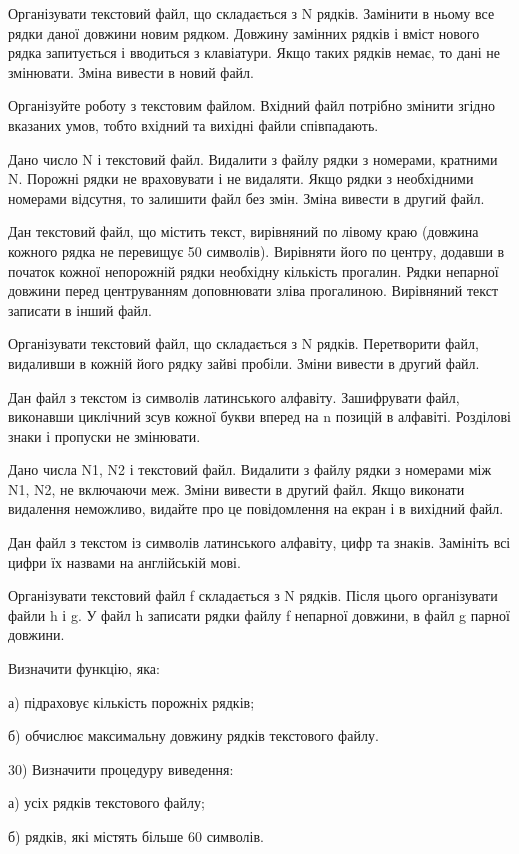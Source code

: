 \documentclass[]{article}
\begin{document}
Організувати текстовий файл, що складається з N рядків. Замінити в ньому
все рядки даної довжини новим рядком. Довжину замінних рядків і вміст
нового рядка запитується і вводиться з клавіатури. Якщо таких рядків
немає, то дані не змінювати. Зміна вивести в новий файл.

\protect\hypertarget{_Hlk65238644}{}{}Організуйте роботу з текстовим
файлом. Вхідний файл потрібно змінити згідно вказаних умов, тобто
вхідний та вихідні файли співпадають.

Дано число N і текстовий файл. Видалити з файлу рядки з номерами,
кратними N. Порожні рядки не враховувати і не видаляти. Якщо рядки з
необхідними номерами відсутня, то залишити файл без змін. Зміна вивести
в другий файл.

Дан текстовий файл, що містить текст, вирівняний по лівому краю (довжина
кожного рядка не перевищує 50 символів). Вирівняти його по центру,
додавши в початок кожної непорожній рядки необхідну кількість прогалин.
Рядки непарної довжини перед центруванням доповнювати зліва прогалиною.
Вирівняний текст записати в інший файл.

Організувати текстовий файл, що складається з N рядків. Перетворити
файл, видаливши в кожній його рядку зайві пробіли. Зміни вивести в
другий файл.

Дан файл з текстом із символів латинського алфавіту. Зашифрувати файл,
виконавши циклічний зсув кожної букви вперед на n позицій в алфавіті.
Розділові знаки і пропуски не змінювати.

Дано числа N1, N2 і текстовий файл. Видалити з файлу рядки з номерами
між N1, N2, не включаючи меж. Зміни вивести в другий файл. Якщо виконати
видалення неможливо, видайте про це повідомлення на екран і в вихідний
файл.

Дан файл з текстом із символів латинського алфавіту, цифр та знаків.
Замініть всі цифри їх назвами на англійській мові.

Організувати текстовий файл f складається з N рядків. Після цього
організувати файли h і g. У файл h записати рядки файлу f непарної
довжини, в файл g парної довжини.

Визначити функцію, яка:

а) підраховує кількість порожніх рядків;

б) обчислює максимальну довжину рядків текстового файлу.

30) Визначити процедуру виведення:

а) усіх рядків текстового файлу;

б) рядків, які містять більше 60 символів.
\end{document}
